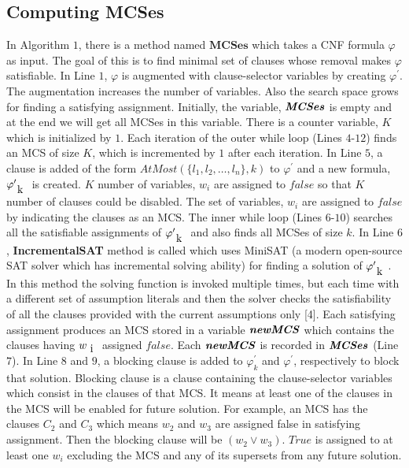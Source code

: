 \subsection{Computing MCSes}
In Algorithm $1$, there is a method named $\textbf{MCSes}$ which takes a CNF formula $\varphi$ as input. The goal of this is to find minimal set of clauses whose removal makes $\varphi$ satisfiable. In Line $1$, $\varphi$ is augmented with clause-selector variables by creating $\varphi^{\prime}$. The augmentation increases the number of variables. Also the search space grows for finding a satisfying assignment. Initially, the variable, $\textbf{\textit{MCSes}}$ is empty and  at the end we will get all MCSes in this variable. There is a counter variable, $K$ which is initialized by $1$.\newline
Each iteration of the outer while loop (Lines $4$-$12$) finds an MCS of size $K$, which is incremented by $1$ after each iteration. In Line $5$, a clause is added of the form $AtMost(\{l_{1},l_{2},\ldots,l_{n}\},k)$ to $\varphi^{\prime}$ and a new formula, $\varphi^{\prime}_{\text k}$ is created. $K$ number of variables, $w_{i}$ are assigned to $false$ so that $K$ number of clauses could be disabled. The set of variables, $w_{i}$ are assigned to $false$ by indicating the clauses as an MCS.\newline
The inner while loop (Lines $6$-$10$) searches all the satisfiable assignments of $\varphi^{\prime}_{\text k}$ and also finds all MCSes of size $k$. In Line $6$, \textbf{IncrementalSAT} method is called which uses MiniSAT (a modern open-source SAT solver which has incremental solving ability) for finding a solution of $\varphi^{\prime}_{\text k}$. In this method the solving function is invoked multiple times, but each time with a different set of assumption literals and then the solver checks the satisfiability of all the clauses provided with the current assumptions only [4]. Each satisfying assignment produces an MCS stored in a variable $\textbf{\textit{newMCS}}$ which contains the clauses having $w_{\text i}$ assigned $false$. Each $\textbf{\textit{newMCS}}$ is recorded in $\textbf{\textit{MCSes}}$ (Line $7$). In Line $8$ and $9$, a blocking clause is added to $\varphi^{\prime}_{k}$ and $\varphi^{\prime}$, respectively to block that solution. Blocking clause is a clause containing the clause-selector variables which consist in the clauses of that MCS. It means at least one of the clauses in the MCS will be enabled for future solution. For example, an MCS has the clauses $C_{2}$ and $C_{3}$ which means $w_{2}$ and $w_{3}$ are assigned false in satisfying assignment. Then the blocking clause will be $(w_{2}\vee w_{3})$. $True$ is assigned to at least one $w_{i}$ excluding the MCS and any of its supersets from any future solution.\newline
